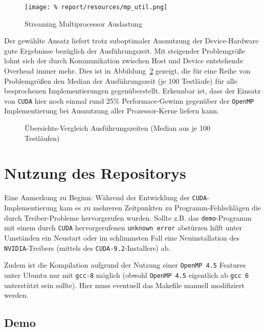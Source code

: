 \documentclass[
    bibliography=totoc, cd=lightcolor, cdmath=false, ngerman]{tudscrreprt}
\begin{document}
\begin{figure}[htbp]
  \begin{center}
    \texttt{[image: \%
    report/resources/mp\_util.png]}
  \end{center}
  \caption{Streaming Multiprocessor Auslastung}
  \label{fig:shm}
\end{figure}

Der gewählte Ansatz liefert trotz suboptimaler Ausnutzung der Device-Hardware
gute Ergebnisse bezüglich der Ausführungszeit. Mit steigender Problemgröße
lohnt sich der durch Kommunikation zwischen Host und Device entstehende
Overhead immer mehr. Dies ist in Abbildung~\ref{fig:all} gezeigt, die für eine
Reihe von Problemgrößen den Median der Ausführungszeit (je 100 Testläufe) für
alle besprochenen Implementierungen gegenüberstellt. Erkennbar ist, dass der
Einsatz von \texttt{CUDA} hier noch einmal rund 25\% Performace-Gewinn gegenüber
der \texttt{OpenMP} Implementierung bei Ausnutzung aller Prozessor-Kerne liefern
kann.

\begin{figure}[htbp]
  \centering
    
  \caption{Übersichts-Vergleich Ausführungszeiten (Median aus je 100 Testläufen)}
  \label{fig:all}
\end{figure}

\chapter{Nutzung des Repositorys}

Eine Anmerkung zu Beginn: Während der Entwicklung der
\texttt{CUDA}-Implementierung kam es zu mehreren Zeitpunkten zu
Programm-Fehlschlägen die durch Treiber-Probleme hervorgerufen wurden. Sollte
z.B. das \texttt{demo}-Programm mit einem durch \texttt{CUDA} hervorgerufenen
\texttt{unknown error} abstürzen hilft unter Umständen ein Neustart oder im
schlimmsten Fall eine Neuinstallation des \texttt{NVIDIA}-Treibers (mittels des
\texttt{CUDA-9.2}-Installers) ab.

Zudem ist die Kompilation aufgrund der Nutzung einer \texttt{OpenMP 4.5}
Features unter Ubuntu nur mit \texttt{gcc-8} möglich (obwohl \texttt{OpenMP 4.5}
eigentlich ab \texttt{gcc 6} unterstützt sein sollte). Hier muss eventuell das
Makefile manuell modifiziert werden.

\section{Demo}
\end{document}
